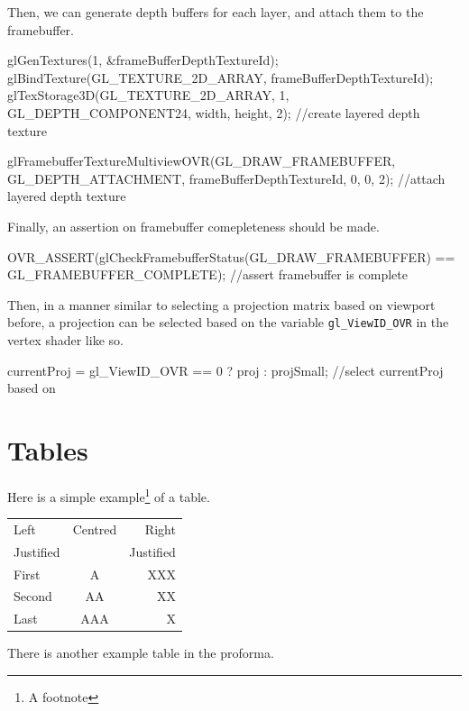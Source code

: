 \documentclass[12pt,a4paper,twoside,openright]{report}
\begin{document}
Then, we can generate depth buffers for each layer, and attach them to the framebuffer.

\begin{blockcode}
glGenTextures(1, &frameBufferDepthTextureId);
glBindTexture(GL_TEXTURE_2D_ARRAY, frameBufferDepthTextureId);
glTexStorage3D(GL_TEXTURE_2D_ARRAY, 1, GL_DEPTH_COMPONENT24, width, height, 2); //create layered depth texture

glFramebufferTextureMultiviewOVR(GL_DRAW_FRAMEBUFFER, GL_DEPTH_ATTACHMENT, frameBufferDepthTextureId, 0, 0, 2); //attach layered depth texture
\end{blockcode}

Finally, an assertion on framebuffer comepleteness should be made.
\begin{blockcode}
OVR_ASSERT(glCheckFramebufferStatus(GL_DRAW_FRAMEBUFFER) == GL_FRAMEBUFFER_COMPLETE); //assert framebuffer is complete
\end{blockcode}


Then, in a manner similar to selecting a projection matrix based on viewport before, a projection can be selected based on the variable \texttt{gl\_ViewID\_OVR} in the vertex shader like so.

\begin{blockcode}
currentProj = gl_ViewID_OVR == 0 ? proj : projSmall; //select currentProj based on 
\end{blockcode}




\section{Tables}

\begin{samepage}
Here is a simple example\footnote{A footnote} of a table.

\begin{center}
\begin{tabular}{l|c|r}
Left      & Centred & Right \\
Justified &         & Justified \\[3mm]
First     & A       & XXX \\
Second    & AA      & XX  \\
Last      & AAA     & X   \\
\end{tabular}
\end{center}

\noindent
There is another example table in the proforma.
\end{samepage}
\end{document}
